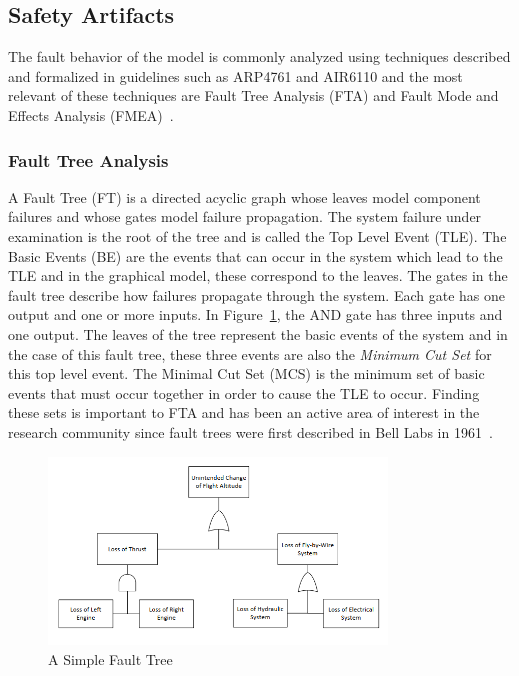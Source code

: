 \subsection{Safety Artifacts}
\label{subsec:safety_artifacts}

The fault behavior of the model is commonly analyzed using techniques described and formalized in guidelines such as ARP4761 and AIR6110 and the most relevant of these techniques are Fault Tree Analysis (FTA) and Fault Mode and Effects Analysis (FMEA)~\cite{SAE:ARP4761, AIR6110, 0f356f05e72f43018211b36f97c8854a, Bozzano:2010:DSA:1951720}. 

\subsubsection{Fault Tree Analysis}
A Fault Tree (FT) is a directed acyclic graph whose leaves model component failures and whose gates model failure propagation. The system failure under examination is the root of the tree and is called the Top Level Event (TLE). The Basic Events (BE) are the events that can occur in the system which lead to the TLE and in the graphical model, these correspond to the leaves. The gates in the fault tree describe how failures propagate through the system. Each gate has one output and one or more inputs. In Figure~\ref{fig:introFT}, the AND gate has three inputs and one output. The leaves of the tree represent the basic events of the system and in the case of this fault tree, these three events are also the \textit{Minimum Cut Set} for this top level event. The Minimal Cut Set (MCS) is the minimum set of basic events that must occur together in order to cause the TLE to occur. Finding these sets is important to FTA and has been an active area of interest in the research community since fault trees were first described in Bell Labs in 1961~\cite{historyFTA, 0f356f05e72f43018211b36f97c8854a}. 

\begin{figure}[h]
\begin{center}
\includegraphics[width=9cm]{images/ft.png}
\caption{A Simple Fault Tree} \label{fig:introFT}
\end{center}
\end{figure}

